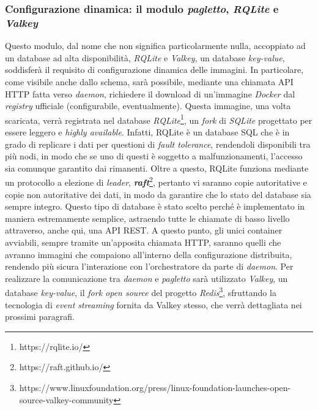 \subsubsection{Configurazione dinamica: il modulo \textit{pagletto}, \textit{RQLite} e \textit{Valkey}}
Questo modulo, dal nome che non significa particolarmente nulla, accoppiato ad un database ad alta disponibilità, \textit{RQLite} e \textit{Valkey}, un database \textit{key-value}, soddisferà il requisito di configurazione dinamica delle immagini. In particolare, come visibile anche dallo schema, sarà possibile, mediante una chiamata API HTTP fatta verso \textit{daemon}, richiedere il download di un'immagine \textit{Docker} dal \textit{registry} ufficiale (configurabile, eventualmente). Questa immagine, una volta scaricata, verrà registrata nel database \textit{RQLite}\footnote{https://rqlite.io/}, un \textit{fork} di \textit{SQLite} progettato per essere leggero e \textit{highly available}.\newline
Infatti, RQLite è un database SQL che è in grado di replicare i dati per questioni di \textit{fault tolerance}, rendendoli disponibili tra più nodi, in modo che se uno di questi è soggetto a malfunzionamenti, l'accesso sia comunque garantito dai rimanenti. Oltre a questo, RQLite funziona mediante un protocollo a elezione di \textit{leader}, \textbf{\textit{raft}}\footnote{https://raft.github.io/}, pertanto vi saranno copie autoritative e copie non autoritative dei dati, in modo da garantire che lo stato del database sia sempre integro. Questo tipo di database è stato scelto perché è implementato in maniera estremamente semplice, astraendo tutte le chiamate di basso livello attraverso, anche qui, una API REST.
A questo punto, gli unici container avviabili, sempre tramite un'apposita chiamata HTTP, saranno quelli che avranno immagini che compaiono all'interno della configurazione distribuita, rendendo più sicura l'interazione con l'orchestratore da parte di \textit{daemon}.
\newline
Per realizzare la comunicazione tra \textit{daemon} e \textit{pagletto} sarà utilizzato \textit{Valkey}, un database \textit{key-value}, il \textit{fork open source} del progetto \textit{Redis}\footnote{https://www.linuxfoundation.org/press/linux-foundation-launches-open-source-valkey-community}, sfruttando la tecnologia di \textit{event streaming} fornita da Valkey stesso, che verrà dettagliata nei prossimi paragrafi. 

